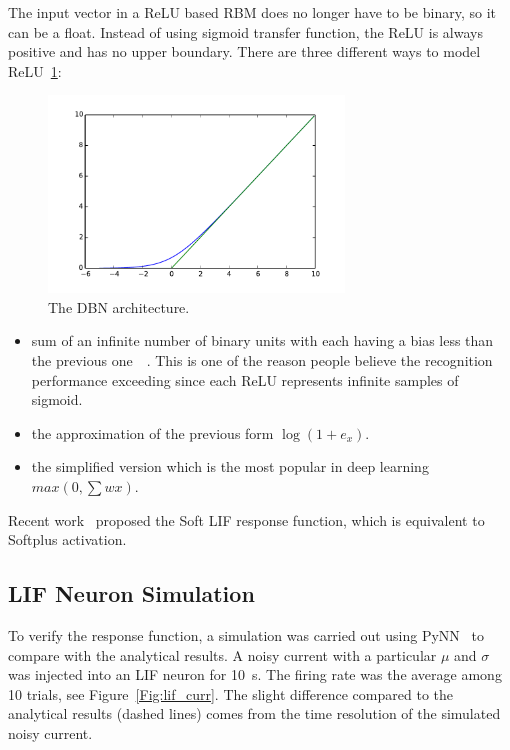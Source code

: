 	The input vector in a ReLU based RBM does no longer have to be binary, so it can be a float.
	Instead of using sigmoid transfer function, the ReLU is always positive and has no upper boundary.
	There are three different ways to model ReLU~\ref{Fig:relu_tranf}:
	\begin{figure}[hbt]
		\centering
		\includegraphics[width=0.7\textwidth]{pics_sdbn/relu.pdf}
		\caption{The DBN architecture.} 
		\label{Fig:relu_tranf}
	\end{figure}
	\begin{itemize}
		\item sum of an infinite number of binary units with each having a bias less than the previous one~~\cite{nair2010rectified}.
		This is one of the reason people believe the recognition performance exceeding since each ReLU represents infinite samples of sigmoid. 
		\item the approximation of the previous form $\log(1+e_x)$.
		\item the simplified version which is the most popular in deep learning $max(0,\sum w x)$.
	\end{itemize}  
	
	Recent work~\cite{hunsberger2015spiking} proposed the Soft LIF response function, which is equivalent to Softplus activation.
	
	
	\subsection{LIF Neuron Simulation}
	To verify the response function, a simulation was carried out using PyNN~\cite{davison2008pynn} to compare with the analytical results.
	A noisy current with a particular $\mu$ and $\sigma$ was injected into an LIF neuron for 10~s.
	The firing rate was the average among 10 trials, see Figure~\ref{Fig:lif_curr}.
	The slight difference compared to the analytical results (dashed lines) comes from the time resolution of the simulated noisy current.
	
